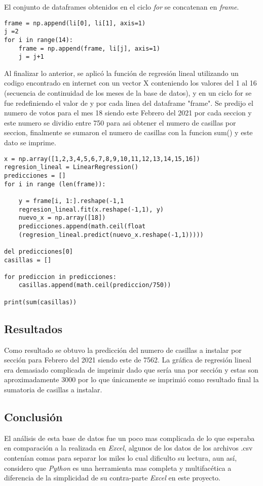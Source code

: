 \documentclass{article}
\begin{document}
\clearpage

El conjunto de dataframes obtenidos en el ciclo \textit{for} se concatenan en \textit{frame}.

\begin{lstlisting}    
frame = np.append(li[0], li[1], axis=1)
j =2
for i in range(14):
    frame = np.append(frame, li[j], axis=1)
    j = j+1        
\end{lstlisting}

Al finalizar lo anterior, se aplicó la función de regresión lineal utilizando un codigo encontrado en internet\cite{pag} con un vector X conteniendo los valores del 1 al 16 (secuencia de continuidad de los meses de la base de datos), y en un ciclo for se fue redefiniendo el valor de y por cada linea del dataframe "frame". Se predijo el numero de votos para el mes 18 siendo este Febrero del 2021 por cada seccion y este numero se dividio entre 750 para asi obtener el numero de casillas por seccion, finalmente se sumaron el numero de casillas con la funcion sum() y este dato se imprime.

\begin{lstlisting}
x = np.array([1,2,3,4,5,6,7,8,9,10,11,12,13,14,15,16])
regresion_lineal = LinearRegression()
predicciones = []
for i in range (len(frame)):

    y = frame[i, 1:].reshape(-1,1
    regresion_lineal.fit(x.reshape(-1,1), y) 
    nuevo_x = np.array([18]) 
    predicciones.append(math.ceil(float
    (regresion_lineal.predict(nuevo_x.reshape(-1,1)))))
    
del predicciones[0]
casillas = []

for prediccion in predicciones:
    casillas.append(math.ceil(prediccion/750))

print(sum(casillas))
\end{lstlisting}

\subsection{Resultados}
Como resultado se obtuvo la predicción del numero de casillas a instalar por sección para Febrero del 2021 siendo este de 7562. La gráfica de regresión lineal era demasiado complicada de imprimir dado que sería una por sección y estas son aproximadamente 3000 por lo que únicamente se imprimió como resultado final la sumatoria de casillas a instalar.

\subsection{Conclusión}
El análisis de esta base de datos fue un poco mas complicada de lo que esperaba en comparación a la realizada en \textit{Excel}, algunos de los datos de los archivos .csv contenían comas para separar los miles lo cual dificulto su lectura, aun así, considero que \textit{Python} es una herramienta mas completa y multifacética a diferencia de la simplicidad de su contra-parte \textit{Excel} en este proyecto.
\end{document}
